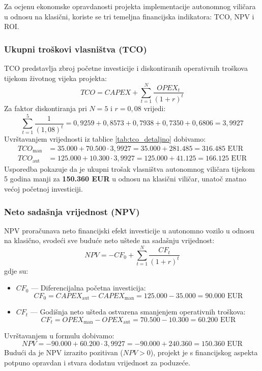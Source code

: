\documentclass[12pt,a4paper]{article}
\begin{document}
Za ocjenu ekonomske opravdanosti projekta implementacije autonomnog viličara u odnosu na klasični, koriste se tri temeljna financijska indikatora: TCO, NPV i ROI.

\subsubsection{Ukupni troškovi vlasništva (TCO)}
TCO predstavlja zbroj početne investicije i diskontiranih operativnih troškova tijekom životnog vijeka projekta:
\begin{equation}
    TCO = CAPEX + \sum_{t=1}^{N} \frac{OPEX_t}{(1 + r)^t}
\end{equation}
Za faktor diskontiranja pri $N=5$ i $r=0,08$ vrijedi:
\begin{equation*}
    \sum_{t=1}^{5} \frac{1}{(1,08)^t} = 0,9259 + 0,8573 + 0,7938 + 0,7350 + 0,6806 = 3,9927
\end{equation*}
Uvrštavanjem vrijednosti iz tablice \ref{tab:tco_detaljno} dobivamo:
\begin{align}
    TCO_{\text{man}} &= 35.000 + 70.500 \cdot 3,9927 = 35.000 + 281.485 = 316.485\text{ EUR} \\
    TCO_{\text{aut}} &= 125.000 + 10.300 \cdot 3,9927 = 125.000 + 41.125 = 166.125\text{ EUR}
\end{align}
Usporedba pokazuje da je ukupni trošak vlasništva autonomnog viličara tijekom 5 godina manji za \textbf{150.360 EUR} u odnosu na klasični viličar, unatoč znatno većoj početnoj investiciji.

\subsubsection{Neto sadašnja vrijednost (NPV)}
NPV proračunava neto financijski efekt investicije u autonomno vozilo u odnosu na klasično, svodeći sve buduće neto uštede na sadašnju vrijednost:
\begin{equation}
    NPV = -CF_0 + \sum_{t=1}^{N} \frac{CF_t}{(1 + r)^t}
\end{equation}
gdje su:
\begin{itemize}
    \item $CF_0$ — Diferencijalna početna investicija:
    \begin{equation*}
        CF_0 = CAPEX_{\text{aut}} - CAPEX_{\text{man}} = 125.000 - 35.000 = 90.000\text{ EUR}
    \end{equation*}
    \item $CF_t$ — Godišnja neto ušteda ostvarena smanjenjem operativnih troškova:
    \begin{equation*}
        CF_t = OPEX_{\text{man}} - OPEX_{\text{aut}} = 70.500 - 10.300 = 60.200\text{ EUR}
    \end{equation*}
\end{itemize}
Uvrštavanjem u formulu dobivamo:
\begin{equation}
    NPV = -90.000 + 60.200 \cdot 3,9927 = -90.000 + 240.360 = 150.360\text{ EUR}
\end{equation}
Budući da je NPV izrazito pozitivan ($NPV > 0$), projekt je s financijskog aspekta potpuno opravdan i stvara dodatnu vrijednost za poduzeće.
\end{document}
